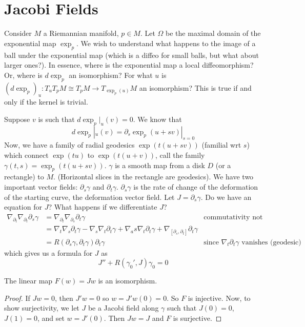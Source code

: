 \documentclass[../main.tex]{subfiles}
\begin{document}
\section{Jacobi Fields}
Consider $M$ a Riemannian manifold, $p\in M$. Let $\Omega$ be the maximal domain
of the exponential map $\exp_p$. We wish to understand what happens to the image
of a ball under the exponential map (which is a diffeo for small balls, but what
about larger ones?). In essence, where is the exponential map a local
diffeomorphism? Or, where is $d\exp_p$ an isomorphism? For what $u$ is
$(d\exp_p)_u:T_uT_pM \cong T_pM \to T_{\exp_p(u)}M$ an isomorphism? This is true
if and only if the kernel is trivial.

Suppose $v$ is such that $d\exp_p|_u(v) = 0$. We know that 
\[
    d\exp_p|_u(v) = \partial_s\exp_p(u+sv)|_{s=0}
\]
Now, we have a family of radial geodesics $\exp(t(u+sv))$ (familial wrt $s$)
which connect $\exp(tu)$ to $\exp(t(u+v))$, call the family $\gamma(t,s) =
\exp_p(t(u+sv))$. $\gamma$ is a smooth map from a disk $D$ (or a rectangle) to
$M$. (Horizontal slices in the rectangle are geodesics). We have two important
vector fields: $\partial_s\gamma$ and $\partial_t\gamma$. $\partial_s\gamma$ is
the rate of change of the deformation of the starting curve, the deformation
vector field. Let $J=\partial_s\gamma$. Do we have an equation for $J$? What
happens if we differentiate $J$?
\[
    \begin{aligned}
    \nabla_{\partial_t}\nabla_{\partial_t}\partial_s\gamma  &=
    \nabla_{\partial_t}\nabla_{\partial_s}\partial_t\gamma &\text{commutativity
    not proven in class}\\
    &= \nabla_t\nabla_s\partial_t\gamma - \nabla_s\nabla_t\partial_t\gamma +
    \nabla_as\nabla_t\partial_t\gamma +
    \nabla_{[\partial_s,\partial_t]}\partial_t\gamma\\
    &=R(\partial_s\gamma,\partial_t\gamma)\partial_t\gamma &\text{since
    $\nabla_t\partial_t\gamma$ vanishes (geodesic)}
\end{aligned}
\]
which gives us a formula for $J$ as
\[
    J'' + R(\gamma_0',J)\gamma_0 = 0
\]

\begin{theorem}
    The linear map $F(w) = Jw$ is an isomorphism.
\end{theorem}
\begin{proof}
    If $Jw = 0$, then $J'w= 0$ so $w = J'w(0) = 0$. So $F$ is injective. Now, to
    show surjectivity, we let $J$ be a Jacobi field along $\gamma$ such that
    $J(0) = 0$, $J(1)=0$, and set $w=J'(0)$. Then $Jw = J$ and $F$ is
    surjective.
\end{proof}
\end{document}
